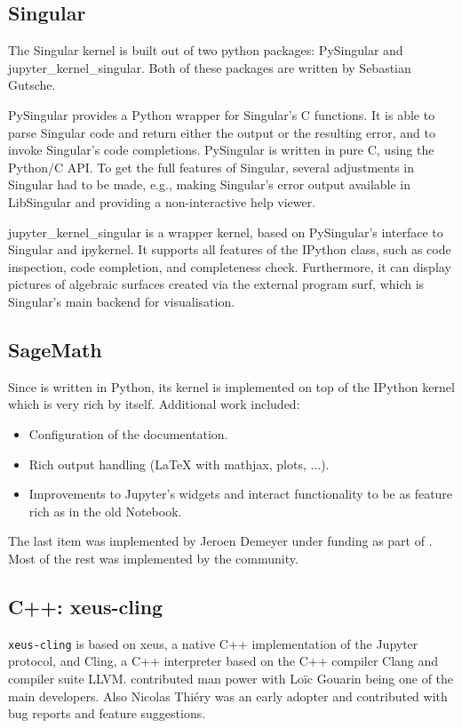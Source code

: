 \documentclass{deliverablereport}
\begin{document}
\subsection{Singular}

The Singular kernel is built out of two python packages: PySingular and jupyter\_kernel\_singular.
Both of these packages are written by Sebastian Gutsche.

PySingular provides a Python wrapper for Singular's C functions.
It is able to parse Singular code and return either the
output or the resulting error, and to invoke Singular's code completions.
PySingular is written in pure C, using the Python/C API.
To get the full features of Singular, several adjustments in Singular had to be made,
e.g., making Singular's error output available in LibSingular and providing a non-interactive help viewer.

jupyter\_kernel\_singular is a wrapper kernel, based on PySingular's interface to Singular and ipykernel.
It supports all features of the IPython class, such as code inspection, code completion, and completeness check.
Furthermore, it can display pictures of algebraic surfaces
created via the external program surf, which is Singular's main backend for visualisation.

\subsection{SageMath}

Since \Sage is written in Python, its kernel is implemented
on top of the IPython kernel which is very rich by itself.
Additional work included:
\begin{itemize}
\item Configuration of the documentation.
\item Rich output handling (LaTeX with mathjax, plots, ...).
\item Improvements to Jupyter's widgets and interact functionality to be as feature rich as in the old \Sage Notebook.
\end{itemize}
The last item was implemented by Jeroen Demeyer under \ODK funding as part of .
Most of the rest was implemented by the \Sage community.

\subsection{C++: xeus-cling}

\texttt{xeus-cling} is based on xeus, a native C++ implementation of the Jupyter protocol, and Cling,
a C++ interpreter based on the C++ compiler Clang and compiler suite LLVM.
\ODK contributed man power with Loïc Gouarin being one of the main developers.
Also Nicolas Thiéry was an early adopter and contributed with bug reports and feature suggestions.
\end{document}
